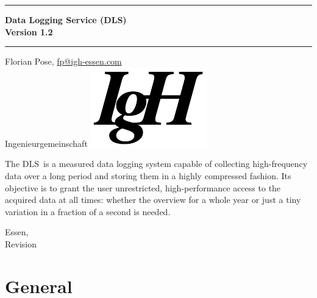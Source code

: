 \documentclass[a4paper,12pt,BCOR6mm,bibtotoc,idxtotoc]{scrbook}
\newcommand{\IgH}{\raisebox{-0.7667ex} {\includegraphics[height=2.2ex]{bilder/ighsign}}}
\begin{document}


 \pagestyle{empty}

\begin{titlepage} \begin{center} \rule{\textwidth}{1.5mm}

{\Huge\bf Data Logging Service (DLS)\\[1ex] Version 1.2}

\vspace{1ex}

\rule{\textwidth}{1.5mm}

\vspace{\fill}

{\Large Florian Pose, \url{fp@igh-essen.com}\\[1ex] Ingenieurgemeinschaft \IgH}

\vspace{\fill}

The \glqq DLS\grqq\ is a measured data logging system capable of collecting high-frequency data over a long period and storing them in a highly compressed fashion. Its objective is to grant the user unrestricted, high-performance access to the acquired data at all times: whether the overview for a whole year or just a tiny variation in a fraction of a second is needed.

\vspace{\fill}

{\large Essen, \rcsInfoLongDate\\[1ex] Revision \rcsInfoRevision} \end{center} \end{titlepage}



\pagestyle{scrheadings}

\tableofcontents



\chapter{General} \label{sec:allg} 

\end{document}
